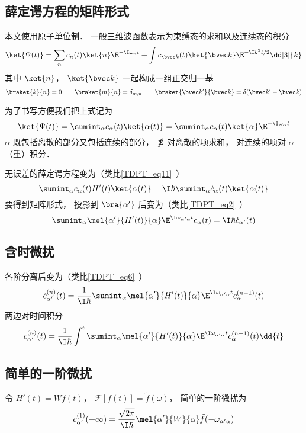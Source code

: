

\subsection{薛定谔方程的矩阵形式}
本文使用原子单位制． 一般三维波函数表示为束缚态的求和以及连续态的积分
\begin{equation}
\ket{\Psi(t)} = \sum_n c_n(t)\ket{n}\E^{-\I\omega_n t} + \int c_{\bvec k}(t)\ket{\bvec k}\E^{-\I k^2 t/2} \dd[3]{k}
\end{equation}
其中 $\ket{n}$， $\ket{\bvec k}$ 一起构成一组正交归一基
\begin{equation}
\braket{k}{n} = 0 \qquad \braket{m}{n} = \delta_{m,n} \qquad \braket{\bvec k'}{\bvec k} = \delta(\bvec k' - \bvec k)
\end{equation}

为了书写方便我们把上式记为
\begin{equation}
\ket{\Psi(t)} = \sumint_\alpha c_\alpha(t) \ket{\alpha(t)} = \sumint_\alpha c_\alpha(t) \ket{\alpha}\E^{-\I\omega_\alpha t} 
\end{equation}
$\alpha$ 既包括离散的部分又包括连续的部分， $\sumint$ 对离散的项求和， 对连续的项对 $\alpha$ （重）积分．

无误差的薛定谔方程变为（类比\autoref{TDPT_eq11}~）
\begin{equation}
\sumint_\alpha c_\alpha(t) H'(t) \ket{\alpha(t)} = \I \hbar \sumint_\alpha \dot c_\alpha(t) \ket{\alpha(t)}
\end{equation}
要得到矩阵形式， 投影到 $\bra{\alpha'}$ 后变为（类比\autoref{TDPT_eq2}~）
\begin{equation}
\sumint_\alpha \mel{\alpha'}{H'(t)}{\alpha} \E^{\I \omega_{\alpha'\alpha} t} c_\alpha(t)
= \I \hbar \dot c_{\alpha'} (t)
\end{equation}

\subsection{含时微扰}
各阶分离后变为（类比\autoref{TDPT_eq6}~）
\begin{equation}
\dot c_{\alpha'}^{(n)}(t) = \frac{1}{\I\hbar} \sumint_\alpha \mel{\alpha'}{H'(t)}{\alpha} \E^{\I \omega_{\alpha'\alpha} t} c_{\alpha}^{(n-1)}(t)
\end{equation}
两边对时间积分
\begin{equation}
c_{\alpha'}^{(n)}(t) = \frac{1}{\I\hbar} \int^t \sumint_\alpha \mel{\alpha'}{H'(t)}{\alpha} \E^{\I \omega_{\alpha'\alpha} t} c_{\alpha}^{(n-1)}(t) \dd{t}
\end{equation}

\subsection{简单的一阶微扰}
令 $H'(t) = W f(t)$， $\mathcal F[f(t)] = \tilde f(\omega)$， 简单的一阶微扰为
\begin{equation}\label{TDPTc_eq1}
c_{\alpha'}^{(1)}(+\infty) = \frac{\sqrt{2\pi}}{\I\hbar} \mel{\alpha'}{W}{\alpha} \tilde f(-\omega_{\alpha'\alpha})
\end{equation}

